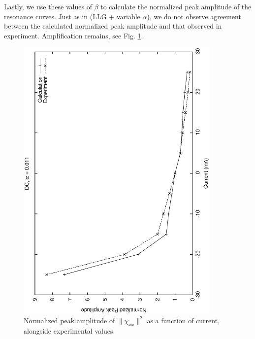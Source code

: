 \documentclass{article}
\begin{document}
Lastly, we use these values of $\beta$ to calculate the normalized peak amplitude of the resonance curves.
Just as in (LLG + variable $\alpha$), we do not observe agreement between the calculated normalized peak amplitude and that observed in experiment. 
Amplification remains, see Fig. \ref{amplification_good}.

\begin{figure}
  \centering
  \includegraphics[angle=-90,width=100mm]{amplification_good.eps}
  \caption{Normalized peak amplitude of $\| \chi_{xx} \|^2$ as a function of current, alongside experimental values. \label{amplification_good}}
\end{figure}
\end{document}
